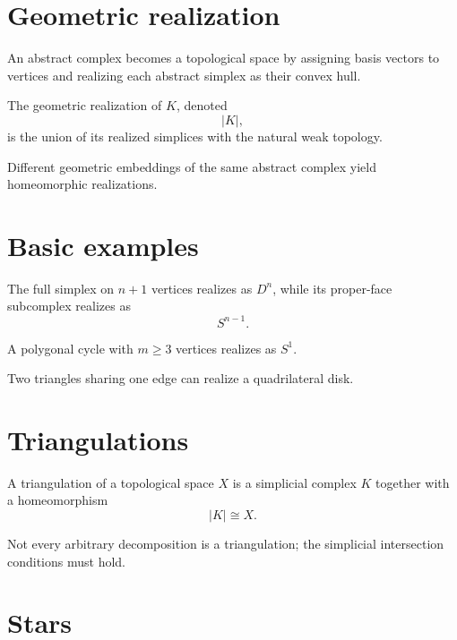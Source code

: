 \section{Geometric realization}

An abstract complex becomes a topological space by assigning basis vectors to
vertices and realizing each abstract simplex as their convex hull.

\begin{definition}
\label{def:viii15-realization}
The geometric realization of \(K\), denoted
\[
|K|,
\]
is the union of its realized simplices with the natural weak topology.
\end{definition}

Different geometric embeddings of the same abstract complex yield homeomorphic
realizations.

\section{Basic examples}

\begin{example}
\label{ex:viii15-simplex-boundary}
The full simplex on \(n+1\) vertices realizes as \(D^n\), while its proper-face
subcomplex realizes as
\[
S^{n-1}.
\]
\end{example}

\begin{example}[Cycle]
A polygonal cycle with \(m\ge3\) vertices realizes as \(S^1\).
\end{example}

\begin{example}
Two triangles sharing one edge can realize a quadrilateral disk.
\end{example}

\section{Triangulations}

\begin{definition}[Triangulation]
\label{def:viii15-triangulation}
A triangulation of a topological space \(X\) is a simplicial complex \(K\)
together with a homeomorphism
\[
|K|\cong X.
\]
\end{definition}

Not every arbitrary decomposition is a triangulation; the simplicial
intersection conditions must hold.

\section{Stars}

